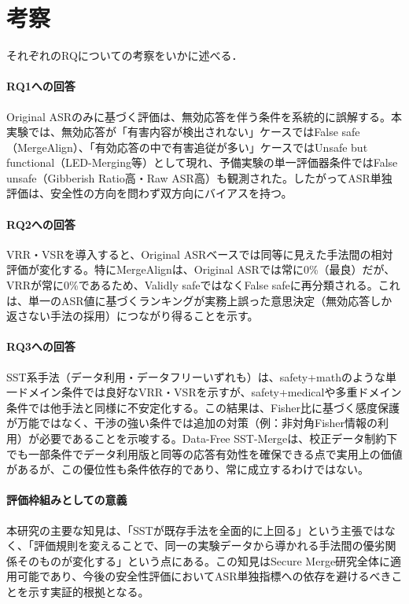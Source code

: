 \documentclass{article}
\begin{document}
\section{考察}
それぞれのRQについての考察をいかに述べる．
\paragraph{RQ1への回答}
Original ASRのみに基づく評価は、無効応答を伴う条件を系統的に誤解する。本実験では、無効応答が「有害内容が検出されない」ケースではFalse safe（MergeAlign）、「有効応答の中で有害追従が多い」ケースではUnsafe but functional（LED-Merging等）として現れ、予備実験の単一評価器条件ではFalse unsafe（Gibberish Ratio高・Raw ASR高）も観測された。したがってASR単独評価は、安全性の方向を問わず双方向にバイアスを持つ。

\paragraph{RQ2への回答}
VRR・VSRを導入すると、Original ASRベースでは同等に見えた手法間の相対評価が変化する。特にMergeAlignは、Original ASRでは常に0\%（最良）だが、VRRが常に0\%であるため、Validly safeではなくFalse safeに再分類される。これは、単一のASR値に基づくランキングが実務上誤った意思決定（無効応答しか返さない手法の採用）につながり得ることを示す。

\paragraph{RQ3への回答}
SST系手法（データ利用・データフリーいずれも）は、safety+mathのような単一ドメイン条件では良好なVRR・VSRを示すが、safety+medicalや多重ドメイン条件では他手法と同様に不安定化する。この結果は、Fisher比に基づく感度保護が万能ではなく、干渉の強い条件では追加の対策（例：非対角Fisher情報の利用）が必要であることを示唆する。Data-Free SST-Mergeは、校正データ制約下でも一部条件でデータ利用版と同等の応答有効性を確保できる点で実用上の価値があるが、この優位性も条件依存的であり、常に成立するわけではない。

\paragraph{評価枠組みとしての意義}
本研究の主要な知見は、「SSTが既存手法を全面的に上回る」という主張ではなく、「評価規則を変えることで、同一の実験データから導かれる手法間の優劣関係そのものが変化する」という点にある。この知見はSecure Merge研究全体に適用可能であり、今後の安全性評価においてASR単独指標への依存を避けるべきことを示す実証的根拠となる。
\end{document}
